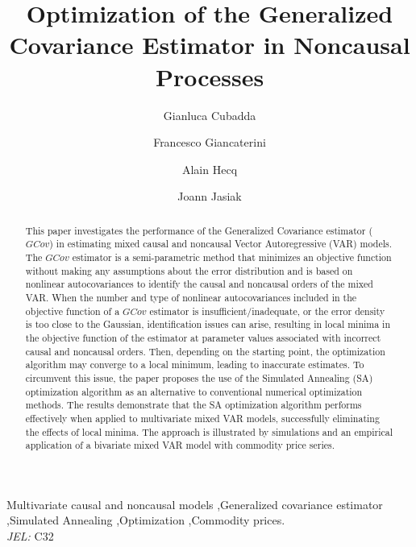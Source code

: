 \documentclass[<1p>]{elsarticle} %
\let\today\relax
\begin{document}
\begin{frontmatter}
\begin{abstract}
This paper investigates the performance of the Generalized Covariance estimator ($GCov$) in estimating mixed causal and noncausal Vector Autoregressive (VAR) models. The $GCov$ estimator is a semi-parametric method that minimizes an objective function without making any assumptions about the error distribution and is based on nonlinear autocovariances to identify the causal and noncausal orders of the mixed VAR. When the number and type of nonlinear autocovariances included in the objective function of a $GCov$ estimator is insufficient/inadequate,  or the error density is too close to the Gaussian, identification issues can arise, resulting in local minima in the objective function of the estimator at parameter values associated with incorrect causal and noncausal orders. Then, depending on the starting point, the optimization algorithm may converge to a local minimum, leading to inaccurate estimates. To circumvent this issue, the paper proposes the use of the Simulated Annealing (SA) optimization algorithm as an alternative to conventional numerical optimization methods. The results demonstrate that the SA optimization algorithm performs effectively when applied to multivariate mixed VAR models, successfully eliminating the effects of local minima. The approach is illustrated by simulations and an empirical application of a bivariate mixed VAR model with commodity price series.
\end{abstract}
\begin{keyword}
Multivariate causal and noncausal models \sep Generalized covariance estimator \sep Simulated Annealing
\sep Optimization \sep Commodity prices.\\
\emph{JEL:} C32
\end{keyword}
\title{Optimization of the Generalized Covariance Estimator in Noncausal Processes}
\date{\today}
\author[a]{Gianluca Cubadda}
\author[b]{Francesco Giancaterini}
\author[b]{Alain Hecq}
\author[c]{Joann Jasiak}
\address[a]{Università di Roma ”Tor Vergata”, Italy}
\address[b]{Maastricht University, The Netherlands}
\address[c]{York University, Canada}
\renewcommand{\thefootnote}{\textdagger} %
\end{frontmatter}
\end{document}

